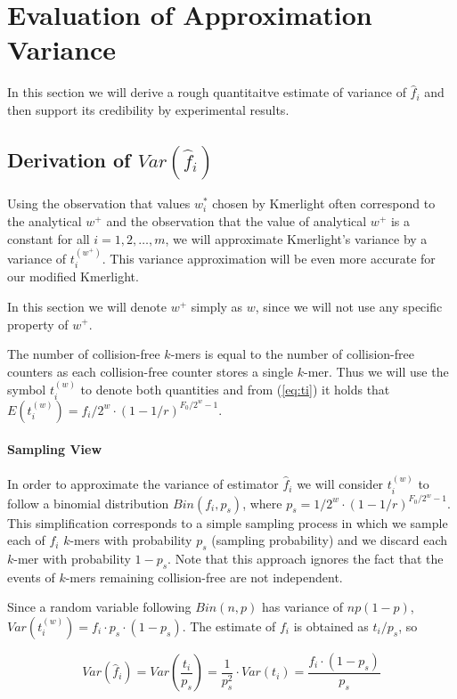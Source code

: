 \section{Evaluation of Approximation Variance}
\label{sec:estimation-variance}

In this section we will derive a rough quantitaitve estimate of variance of $ \hat f_i$
and then support its credibility by experimental results.

\subsection{Derivation of $Var(\hat f_i)$}
Using the observation that values $w_i^*$ chosen by Kmerlight often correspond
to the analytical $w^+$ and the observation that the value of analytical $w^+$ is a constant
for all $i=1, 2, \dots, m$, we will approximate Kmerlight's variance by a variance
of $t_i^{(w^+)}$. This variance approximation will be even more accurate for our modified
Kmerlight. 

In this section we will denote
$w^+$ simply as $w$, since we will not use any specific property of $w^+$.

The number of collision-free $k$-mers is equal to the number of collision-free counters
as each collision-free counter stores a single $k$-mer. Thus we will use the symbol
$t_i^{(w)}$ to denote both quantities and  from (\ref{eq:ti}) it holds that 
$E(t_i^{(w)}) = f_i/2^w \cdot (1 - 1/r)^{F_0/2^w-1}$.

\paragraph{Sampling View}
In order to approximate the variance of estimator $\hat f_i$ we will consider
$t_i^{(w)}$ to follow a binomial distribution $Bin(f_i, p_s)$, where
$p_s = 1/2^w \cdot (1 - 1/r)^{F_0/2^w-1}$.
This simplification corresponds to a simple sampling process in which we sample each of $f_i$ 
$k$-mers with probability $p_s$ (sampling probability) and we discard each $k$-mer
with probability $1 - p_s$. Note that this approach ignores the fact that the events
of $k$-mers remaining collision-free are not independent. 

Since a random variable following $Bin(n, p)$ has variance of $np(1-p)$, 
$Var(t_i^{(w)}) = f_i \cdot p_s \cdot (1-p_s)$. The estimate of $f_i$ is obtained
as $t_i / p_s$, so

\begin{equation} \label{eq:varhatfi}
Var(\hat f_i) = Var \left( \frac{t_i}{p_s} \right) = \frac{1}{p_s^2}
\cdot Var(t_i) = \frac{f_i \cdot (1 - p_s)}{p_s}
\end{equation}

